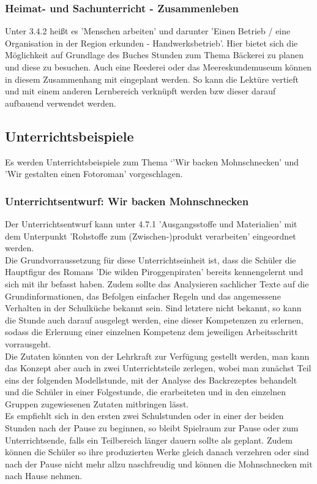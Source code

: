 \subsubsection{Heimat- und Sachunterricht - Zusammenleben}

Unter 3.4.2 heißt es 'Menschen arbeiten' und darunter 'Einen Betrieb / eine Organisation in der Region erkunden - Handwerksbetrieb'.\cite[S.196]{LP GS 2000}  Hier bietet sich die Möglichkeit auf Grundlage des Buches Stunden zum Thema Bäckerei zu planen und diese zu besuchen. Auch eine Reederei oder das Meereskundemuseum können in diesem Zusammenhang mit eingeplant werden. So kann die Lektüre vertieft und mit einem anderen Lernbereich verknüpft werden bzw dieser darauf aufbauend verwendet werden.


\subsection{Unterrichtsbeispiele}

Es werden Unterrichtsbeispiele zum Thema `'Wir backen Mohnschnecken' und 'Wir gestalten einen Fotoroman' vorgeschlagen. 

\subsubsection{Unterrichtsentwurf: Wir backen Mohnschnecken}

Der Unterrichtsentwurf kann unter 4.7.1 'Ausgangsstoffe und Materialien' mit dem Unterpunkt 'Rohstoffe zum (Zwischen-)produkt verarbeiten' \cite[S.268]{LP GS 2000} eingeordnet werden.
\\
Die Grundvorraussetzung für diese Unterrichtseinheit ist, dass die Schüler die Hauptfigur des Romans 'Die wilden Piroggenpiraten' bereits kennengelernt und sich mit ihr befasst haben. Zudem sollte das Analysieren sachlicher Texte auf die Grundinformationen, das Befolgen einfacher Regeln und das angemessene Verhalten in der Schulküche bekannt sein. Sind letztere nicht bekannt, so kann die Stunde auch darauf ausgelegt werden, eine dieser Kompetenzen zu erlernen, sodass die Erlernung einer einzelnen Kompetenz dem jeweiligen Arbeitsschritt vorrausgeht.
\\
Die Zutaten könnten von der Lehrkraft zur Verfügung gestellt werden, man kann das Konzept aber auch in zwei Unterrichtsteile zerlegen, wobei man zunächst Teil eins der folgenden Modellstunde, mit der Analyse des Backrezeptes behandelt und die Schüler in einer Folgestunde, die erarbeiteten und in den einzelnen Gruppen zugewiesenen Zutaten mitbringen lässt.
\\
Es empfiehlt sich in den ersten zwei Schulstunden oder in einer der beiden Stunden nach der Pause zu beginnen, so bleibt Spielraum zur Pause oder zum Unterrichtsende, falls ein Teilbereich länger dauern sollte als geplant. Zudem können die Schüler so ihre produzierten Werke gleich danach verzehren oder sind nach der Pause nicht mehr allzu naschfreudig und können die Mohnschnecken mit nach Hause nehmen.

